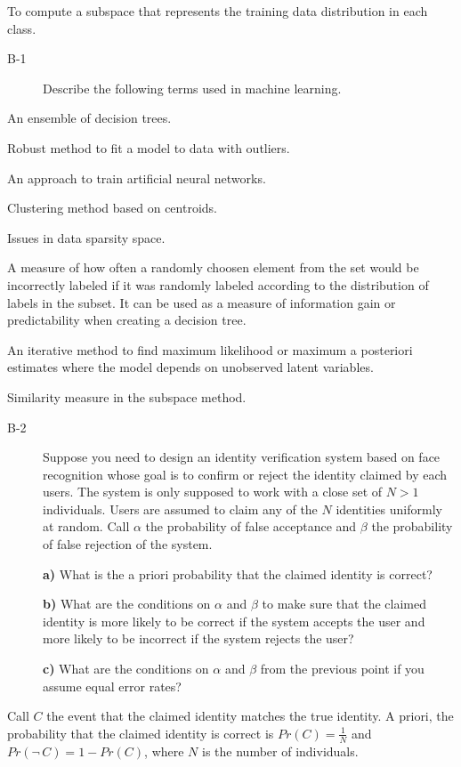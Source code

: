 \documentclass[10pt,a4paper]{article}
\newenvironment{prob}[1]%
   {%
    \begin{description}\item[#1]}%
   {\end{description}}
\begin{document}
To compute a subspace that represents the training data distribution
in each class.
\begin{prob}{B-1}
  Describe the following terms used in machine learning.
\end{prob}
\begin{description}[style=nextline]
\item[Random forests]
  An ensemble of decision trees.
\item[RANSAC]
  Robust method to fit a model to data with outliers.
\item[Dropout]
  An approach to train artificial neural networks.
\item[$k$-means]
  Clustering method based on centroids.
\item[Curse of dimensionality]
  Issues in data sparsity space.
\item[Gini impurity] A measure of how often a randomly choosen element
  from the set would be incorrectly labeled if it was randomly labeled
  according to the distribution of labels in the subset. It can be
  used as a measure of information gain or predictability when
  creating a decision tree.
\item[Expected maximization]
  An iterative method to find maximum likelihood or maximum a
  posteriori estimates where the model depends on unobserved latent
  variables.
\item[Projection length]
  Similarity measure in the subspace method.
\end{description}
\begin{prob}{B-2}
  Suppose you need to design an identity verification system based on
  face recognition whose goal is to confirm or reject the identity
  claimed by each users. The system is only supposed to work with a
  close set of $N > 1$ individuals. Users are assumed to claim any of
  the $N$ identities uniformly at random. Call $\alpha$ the
  probability of false acceptance and $\beta$ the probability of false
  rejection of the system.

  \textbf{a)} What is the a priori probability that the claimed
  identity is correct?

  \textbf{b)} What are the conditions on $\alpha$ and $\beta$ to make
  sure that the claimed identity is more likely to be correct if the
  system accepts the user and more likely to be incorrect if the
  system rejects the user?

  \textbf{c)} What are the conditions on $\alpha$ and $\beta$ from the
  previous point if you assume equal error rates?
\end{prob}
Call $C$ the event that the claimed identity matches the true
identity. A priori, the probability that the claimed identity is
correct is $Pr(C) = \frac{1}{N}$ and $Pr(\neg\,C) = 1 - Pr(C)$, where
$N$ is the number of individuals.
\end{document}
